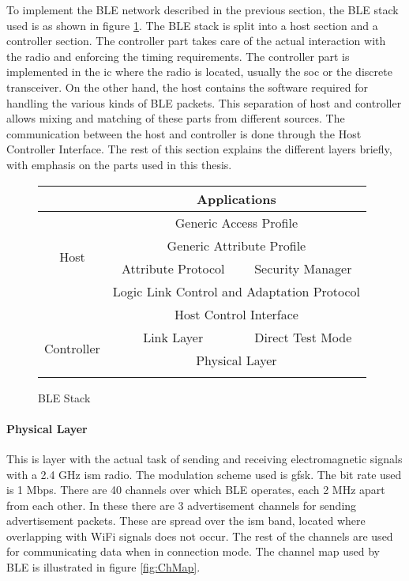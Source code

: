 To implement the BLE network described in the previous section, the BLE stack used is as shown in figure \ref{fig:StackBLE}. The BLE stack is split into a host section and a controller section. The controller part takes care of the actual interaction with the radio and enforcing the timing requirements. The controller part is implemented in the \gls{ic} where the radio is located, usually the \gls{soc} or the discrete transceiver. On the other hand, the host contains the software required for handling the various kinds of BLE packets. This separation of host and controller allows mixing and matching of these parts from different sources. The communication between the host and controller is done through the Host Controller Interface. The rest of this section explains the different layers briefly, with emphasis on the parts used in this thesis.

\begin{figure}[h]
\begin{center}
\setlength{\extrarowheight}{1.5pt}
\begin{tabular}{|c||c|c|}
\cline{2-3}
\multicolumn{1}{c|}{} &  \multicolumn{ 2}{c|}{Applications} \\ \hline
\multirow{4}{*}{Host} & \multicolumn{ 2}{c|}{Generic Access Profile} \\ \cline{ 2- 3}
 & \multicolumn{ 2}{c|}{Generic Attribute Profile} \\ \cline{ 2- 3}
 & \multicolumn{1}{c|}{Attribute Protocol} & \multicolumn{1}{c|}{Security Manager} \\ \cline{ 2- 3}
 & \multicolumn{ 2}{c|}{Logic Link Control and Adaptation Protocol} \\ \hline 
\multicolumn{1}{c|}{} & \multicolumn{ 2}{c|}{Host Control Interface} \\ \hline
\multirow{2}{*}{Controller} & \multicolumn{1}{c|}{Link Layer} & \multicolumn{1}{c|}{Direct Test Mode} \\ \cline{ 2- 3}
 & \multicolumn{ 2}{c|}{Physical Layer} \\ \hline
\multicolumn{ 1}{c}{} & \multicolumn{1}{m{4cm}}{} & \multicolumn{1}{m{4cm}}{} \\ 
\end{tabular}
\end{center}
\vspace{-30pt}
\caption{BLE Stack}
\label{fig:StackBLE}
\vspace{-10pt}
\end{figure}

\paragraph{Physical Layer}
This is layer with the actual task of sending and receiving electromagnetic signals with a 2.4 GHz \gls{ism} radio. The modulation scheme used is \gls{gfsk}. The bit rate used is 1 Mbps. There are 40 channels over which BLE operates, each 2 MHz apart from each other. In these there are 3 advertisement channels for sending advertisement packets. These are spread over the \gls{ism} band, located where overlapping with WiFi signals does not occur. The rest of the channels are used for communicating data when in connection mode. The channel map used by BLE is illustrated in figure \ref{fig:ChMap}.

